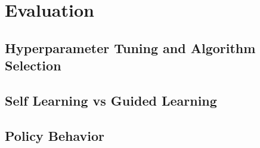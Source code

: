 \section{Evaluation}\label{sec:eval}


\subsection{Hyperparameter Tuning and Algorithm Selection}

\subsection{Self Learning vs Guided Learning}

\subsection{Policy Behavior}
